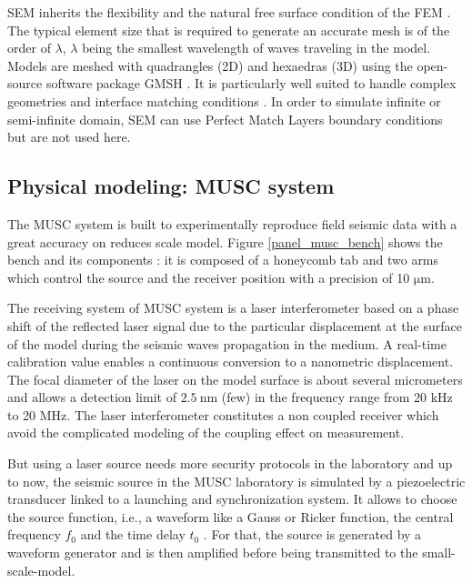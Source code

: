 \documentclass[manuscript,revised]{geophysics}
\begin{document}
\noindent SEM inherits the flexibility and the natural free surface condition of the FEM \citep{Tromp_SEM_2008}. The typical element size that is required to generate an accurate mesh is of the order of $\lambda$, $\lambda$ being the smallest wavelength of waves traveling in the model.  Models are meshed with quadrangles (2D) and hexaedras (3D) using the open-source software package GMSH \citep{Geuzaine_MSH_2009}. It is particularly well suited to handle complex geometries and interface matching conditions \citep{Cristini_SEM_2012}. In order to simulate infinite or semi-infinite domain, SEM can use Perfect Match Layers boundary conditions \citep{Berenger_PML_1994,Festa_PML_2005} but are not used here.


\subsection{Physical modeling: MUSC system}

\noindent The MUSC system \citep{Bretaudeau_SSA_2008b,Bretaudeau_SSM_2011,Bretaudeau_FWI_2013} is built to experimentally reproduce field seismic data with a great accuracy on reduces scale model. Figure \ref{panel_musc_bench} shows the bench and its components : it is composed of a honeycomb tab and two arms which control the source and the receiver position with a precision of 10 $\mathrm{\mu m}$.

\noindent The receiving system of MUSC system is a laser interferometer based on a phase shift of the reflected laser signal due to the particular displacement at the surface of the model during the seismic waves propagation in the medium. A real-time calibration value enables a continuous conversion to a nanometric displacement. The focal diameter of the laser on the model surface is about several micrometers and allows a detection limit of $\mathrm{2.5\ nm}$ (few) in the frequency range from 20 kHz to 20 MHz. The laser interferometer constitutes a non coupled receiver which avoid the complicated modeling of the coupling effect on measurement.  

\noindent But using a laser source needs more security protocols in the laboratory and up to now, the seismic source in the MUSC laboratory is simulated by a piezoelectric transducer linked to a launching and synchronization system. It allows to choose the source function, i.e., a waveform like a Gauss or Ricker function, the central frequency $f_{0}$ and the time delay $t_{0}$ . For that, the source is generated by a waveform generator and is then amplified before being transmitted to the small-scale-model.
\end{document}
